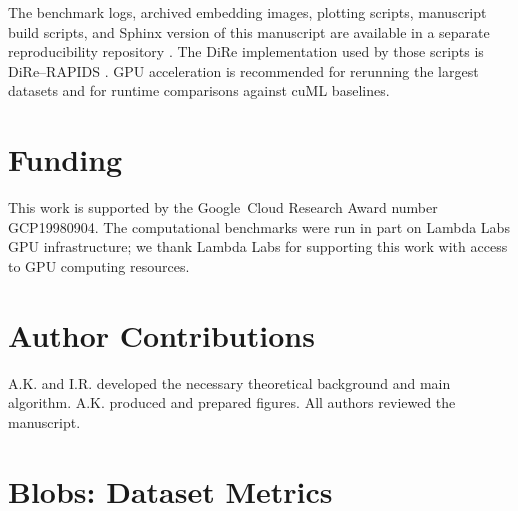 \documentclass[11pt]{article}
\begin{document}
The benchmark logs, archived embedding images, plotting scripts, manuscript build scripts, and Sphinx version of this manuscript are available in a separate reproducibility repository \cite{homological-stability-repro}. The DiRe implementation used by those scripts is DiRe--RAPIDS \cite{dire-rapids}. GPU acceleration is recommended for rerunning the largest datasets and for runtime comparisons against cuML baselines.

\section{Funding} This work is supported by the Google~Cloud Research Award number GCP19980904. The computational benchmarks were run in part on Lambda Labs GPU infrastructure; we thank Lambda Labs for supporting this work with access to GPU computing resources.

\section{Author Contributions} A.K. and I.R. developed the necessary theoretical background and main algorithm. A.K. produced and prepared figures. All authors reviewed the manuscript.

\newpage

\printbibliography

\newpage

\section{Blobs: Dataset Metrics}\label{appendix:blobs}
\end{document}
